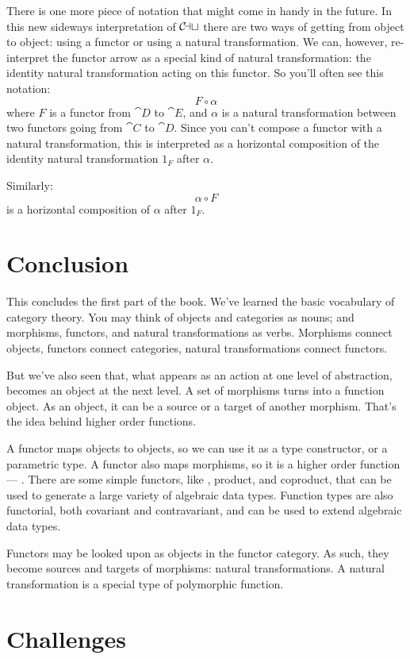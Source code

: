 There is one more piece of notation that might come in handy in the
future. In this new sideways interpretation of $\mathcal{C\mkern-3mu at}$ there are
two ways of getting from object to object: using a functor or using a
natural transformation. We can, however, re-interpret the functor arrow
as a special kind of natural transformation: the identity natural
transformation acting on this functor. So you'll often see this
notation:
\[F \circ \alpha\]
where $F$ is a functor from $\cat{D}$ to $\cat{E}$, and $\alpha$ is a natural transformation
between two functors going from $\cat{C}$ to $\cat{D}$. Since you can't compose a
functor with a natural transformation, this is interpreted as a
horizontal composition of the identity natural transformation
$1_F$ after $\alpha$.

Similarly:
\[\alpha \circ F\]
is a horizontal composition of $\alpha$ after $1_F$.

\section{Conclusion}

This concludes the first part of the book. We've learned the basic
vocabulary of category theory. You may think of objects and categories
as nouns; and morphisms, functors, and natural transformations as verbs.
Morphisms connect objects, functors connect categories, natural
transformations connect functors.

But we've also seen that, what appears as an action at one level of
abstraction, becomes an object at the next level. A set of morphisms
turns into a function object. As an object, it can be a source or a
target of another morphism. That's the idea behind higher order
functions.

A functor maps objects to objects, so we can use it as a type
constructor, or a parametric type. A functor also maps morphisms, so it
is a higher order function --- . There are some simple
functors, like , product, and coproduct, that can be used
to generate a large variety of algebraic data types. Function types are
also functorial, both covariant and contravariant, and can be used to
extend algebraic data types.

Functors may be looked upon as objects in the functor category. As such,
they become sources and targets of morphisms: natural transformations. A
natural transformation is a special type of polymorphic function.

\section{Challenges}

